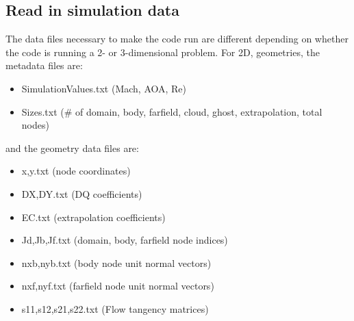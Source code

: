 \documentclass[12pt]{article}
\begin{document}
    \subsection{Read in simulation data}
    The data files necessary to make the code run are different depending on whether the code is running a 2- or 3-dimensional problem. For 2D, geometries, the metadata files are:
    \begin{itemize}
        \item SimulationValues.txt (Mach, AOA, Re)
        \item Sizes.txt (\# of domain, body, farfield, cloud, ghost, extrapolation, total nodes)
    \end{itemize}
    and the geometry data files are:
    \begin{itemize}
        \item x,y.txt (node coordinates)
        \item DX,DY.txt (DQ coefficients)
        \item EC.txt (extrapolation coefficients)
        \item Jd,Jb,Jf.txt (domain, body, farfield node indices)
        \item nxb,nyb.txt (body node unit normal vectors)
        \item nxf,nyf.txt (farfield node unit normal vectors)
        \item s11,s12,s21,s22.txt (Flow tangency matrices)
    \end{itemize}
\end{document}
